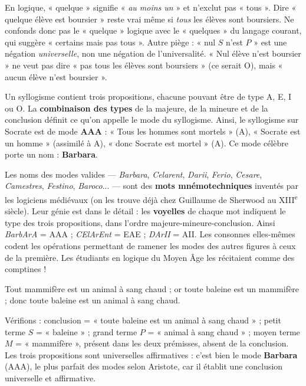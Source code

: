 \documentclass[11pt]{article}
\newcommand{\cle}[1]{{\popxbold\color{popdark}#1}}
\newcounter{popsec}
\newcounter{popsub}
\newcommand{\courssub}[1]{%
  \stepcounter{popsub}%
  \par\vspace{9pt}\noindent{\popxbold\fontsize{11.5}{13}\selectfont\color{popink}{\color{poporange}\thepopsec.\thepopsub}\hspace{6pt}#1}\par\nopagebreak\vspace{4pt}
}
\begin{document}
\begin{attention}
En logique, « quelque » signifie « \emph{au moins un} » et n'exclut pas « tous ». Dire « quelque élève est boursier » reste vrai même si \emph{tous} les élèves sont boursiers. Ne confonds donc pas le « quelque » logique avec le « quelques » du langage courant, qui suggère « certains mais pas tous ». Autre piège : « nul $S$ n'est $P$ » est une négation \emph{universelle}, non une négation de l'universalité. « Nul élève n'est boursier » ne veut pas dire « pas tous les élèves sont boursiers » (ce serait O), mais « aucun élève n'est boursier ».
\end{attention}

\courssub{Les modes et les figures}

Un syllogisme contient trois propositions, chacune pouvant être de type A, E, I ou O. La \textbf{combinaison des types} de la majeure, de la mineure et de la conclusion définit ce qu'on appelle le \cle{mode} du syllogisme. Ainsi, le syllogisme sur Socrate est de mode \textbf{AAA} : « Tous les hommes sont mortels » (A), « Socrate est un homme » (assimilé à A), « donc Socrate est mortel » (A). Ce mode célèbre porte un nom : \textbf{Barbara}.

\begin{savaistu}
Les noms des modes valides — \emph{Barbara}, \emph{Celarent}, \emph{Darii}, \emph{Ferio}, \emph{Cesare}, \emph{Camestres}, \emph{Festino}, \emph{Baroco}... — sont des \textbf{mots mnémotechniques} inventés par les logiciens médiévaux (on les trouve déjà chez Guillaume de Sherwood au XIII\textsuperscript{e} siècle). Leur génie est dans le détail : les \textbf{voyelles} de chaque mot indiquent le type des trois propositions, dans l'ordre majeure-mineure-conclusion. Ainsi \emph{BarbArA} = AAA ; \emph{CElArEnt} = EAE ; \emph{DArII} = AII. Les consonnes elles-mêmes codent les opérations permettant de ramener les modes des autres figures à ceux de la première. Les étudiants en logique du Moyen Âge les récitaient comme des comptines !
\end{savaistu}

\begin{exemplebox}
\guillemotleft Tout mammifère est un animal à sang chaud ; or toute baleine est un mammifère ; donc toute baleine est un animal à sang chaud. \guillemotright\

Vérifions : conclusion = « toute baleine est un animal à sang chaud » ; petit terme $S$ = « baleine » ; grand terme $P$ = « animal à sang chaud » ; moyen terme $M$ = « mammifère », présent dans les deux prémisses, absent de la conclusion. Les trois propositions sont universelles affirmatives : c'est bien le mode \textbf{Barbara} (AAA), le plus parfait des modes selon Aristote, car il établit une conclusion universelle et affirmative.
\end{exemplebox}
\end{document}
